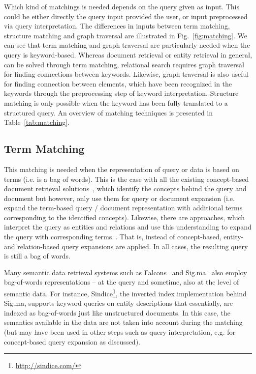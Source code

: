 Which kind of matchings is needed depends on the query given as input. This could be either directly the query input provided the user, or input preprocessed via query interpretation. 
The differences in inputs between term matching, structure matching and graph traversal are illustrated in Fig.~\ref{fig:matching}. We can see that term matching and graph traversal are particularly needed when the query is keyword-based. Whereas document retrieval or entity retrieval in general, can be solved through term matching, relational search requires graph traversal for finding connections between keywords. Likewise, graph traversal is also useful for finding connection between elements, which have been recognized in the keywords through the preprocessing step of keyword interpretation. Structure matching is only possible when the keyword has been fully translated to a structured query. An overview of matching techniques is presented in Table~\ref{tab:matching}. 

\subsection{Term Matching} 
This matching is needed when the representation of query or data is based on terms (i.e. is a bag of words). This is the case with all the existing concept-based document retrieval solutions~\cite{DBLP:conf/sigir/Giger88,DBLP:conf/sigir/ZhongH06,DBLP:conf/trec/JelierSEWMSMK03,DBLP:conf/sigir/QiuF93,DBLP:conf/sigir/QiuF93,DBLP:conf/sigir/Voorhees93,DBLP:conf/sigir/Voorhees94,DBLP:journals/ipm/MeijTRK10}, which identify the concepts behind the query and document but however, only use them for query or document expansion (i.e. expand the term-based query / document representation with additional terms corresponding to the identified concepts). Likewise, there are approaches, which interpret the query as entities and relations and use this understanding to expand the query with corresponding terms~\cite{DBLP:series/sci/NgoC10}. That is, instead of concept-based, entity- and relation-based query expansions are applied. In all cases, the resulting query is still a bag of words. 

Many semantic data retrieval systems such as Falcons~\cite{DBLP:journals/ijswis/ChengQ09} and Sig.ma~\cite{DBLP:journals/ws/TummarelloCCDDD10} also employ bag-of-words representations -- at the query and sometime, also at the level of semantic data. For instance, Sindice\footnote{\url{http://sindice.com/}}, the inverted index implementation behind Sig.ma, supports keyword queries on entity descriptions that essentially, are indexed as bag-of-words just like unstructured documents. In this case, the semantics available in the data are not taken into account during the matching (but may have been used in other steps such as query interpretation, e.g. for concept-based query expansion as discussed). 

